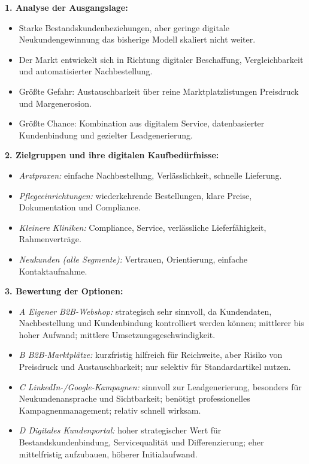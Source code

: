 \documentclass[11pt,a4paper,oneside]{article}
\begin{document}
\begin{loesungbox}
\textbf{1. Analyse der Ausgangslage:}
\begin{itemize}
  \item Starke Bestandskundenbeziehungen, aber geringe digitale Neukundengewinnung \textendash{} das bisherige Modell skaliert nicht weiter.
  \item Der Markt entwickelt sich in Richtung digitaler Beschaffung, Vergleichbarkeit und automatisierter Nachbestellung.
  \item Größte Gefahr: Austauschbarkeit über reine Marktplatzlistungen \textendash{} Preisdruck und Margenerosion.
  \item Größte Chance: Kombination aus digitalem Service, datenbasierter Kundenbindung und gezielter Leadgenerierung.
\end{itemize}

\textbf{2. Zielgruppen und ihre digitalen Kaufbedürfnisse:}
\begin{itemize}
  \item \emph{Arztpraxen:} einfache Nachbestellung, Verlässlichkeit, schnelle Lieferung.
  \item \emph{Pflegeeinrichtungen:} wiederkehrende Bestellungen, klare Preise, Dokumentation und Compliance.
  \item \emph{Kleinere Kliniken:} Compliance, Service, verlässliche Lieferfähigkeit, Rahmenverträge.
  \item \emph{Neukunden (alle Segmente):} Vertrauen, Orientierung, einfache Kontaktaufnahme.
\end{itemize}

\textbf{3. Bewertung der Optionen:}
\begin{itemize}
  \item \emph{A \textendash{} Eigener B2B-Webshop:} strategisch sehr sinnvoll, da Kundendaten, Nachbestellung und Kundenbindung kontrolliert werden können; mittlerer bis hoher Aufwand; mittlere Umsetzungsgeschwindigkeit.
  \item \emph{B \textendash{} B2B-Marktplätze:} kurzfristig hilfreich für Reichweite, aber Risiko von Preisdruck und Austauschbarkeit; nur selektiv für Standardartikel nutzen.
  \item \emph{C \textendash{} LinkedIn-/Google-Kampagnen:} sinnvoll zur Leadgenerierung, besonders für Neukundenansprache und Sichtbarkeit; benötigt professionelles Kampagnenmanagement; relativ schnell wirksam.
  \item \emph{D \textendash{} Digitales Kundenportal:} hoher strategischer Wert für Bestandskundenbindung, Servicequalität und Differenzierung; eher mittelfristig aufzubauen, höherer Initialaufwand.
\end{itemize}


\end{loesungbox}
\end{document}
